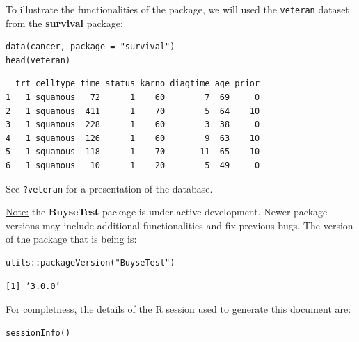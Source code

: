 \documentclass[12pt]{article}
\begin{document}
To illustrate the functionalities of the package, we will used the
\texttt{veteran} dataset from the \textbf{survival} package:
\lstset{language=r,label= ,caption= ,captionpos=b,numbers=none}
\begin{lstlisting}
data(cancer, package = "survival")
head(veteran)
\end{lstlisting}

\begin{verbatim}
  trt celltype time status karno diagtime age prior
1   1 squamous   72      1    60        7  69     0
2   1 squamous  411      1    70        5  64    10
3   1 squamous  228      1    60        3  38     0
4   1 squamous  126      1    60        9  63    10
5   1 squamous  118      1    70       11  65    10
6   1 squamous   10      1    20        5  49     0
\end{verbatim}


See \texttt{?veteran} for a presentation of the database.

\bigskip

\uline{Note:} the \textbf{BuyseTest} package is under active development. Newer
package versions may include additional functionalities and fix
previous bugs. The version of the package that is being is:
\lstset{language=r,label= ,caption= ,captionpos=b,numbers=none}
\begin{lstlisting}
utils::packageVersion("BuyseTest")
\end{lstlisting}

\begin{verbatim}
[1] ‘3.0.0’
\end{verbatim}


For completness, the details of the R session used to generate this
document are:
\lstset{language=r,label= ,caption= ,captionpos=b,numbers=none}
\begin{lstlisting}
sessionInfo()
\end{lstlisting}
\end{document}
